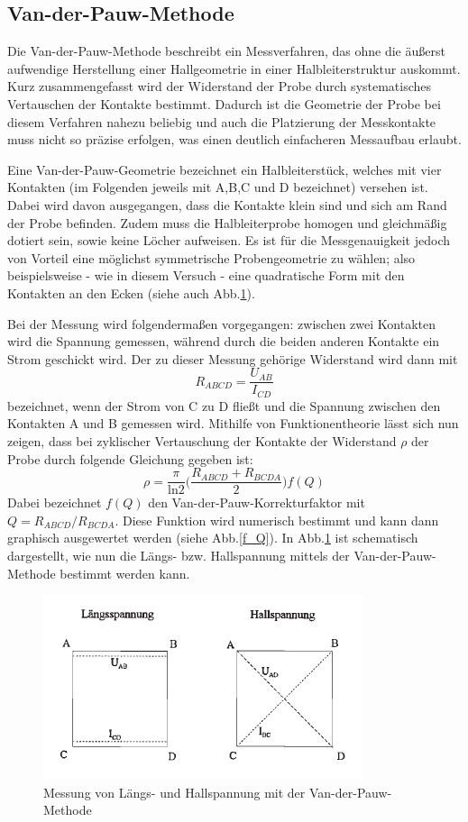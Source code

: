 	\subsection{Van-der-Pauw-Methode}
	Die Van-der-Pauw-Methode beschreibt ein Messverfahren, das ohne die äußerst aufwendige Herstellung einer Hallgeometrie in einer Halbleiterstruktur auskommt. Kurz zusammengefasst wird der Widerstand der Probe durch systematisches Vertauschen der Kontakte bestimmt. Dadurch ist die Geometrie der Probe bei diesem Verfahren nahezu beliebig und auch die Platzierung der Messkontakte muss nicht so präzise erfolgen, was einen deutlich einfacheren Messaufbau erlaubt.
	
	Eine Van-der-Pauw-Geometrie bezeichnet ein Halbleiterstück, welches mit vier Kontakten (im Folgenden jeweils mit A,B,C und D bezeichnet) versehen ist. Dabei wird davon ausgegangen, dass die Kontakte klein sind und sich am Rand der Probe befinden. Zudem muss die Halbleiterprobe homogen und gleichmäßig dotiert sein, sowie keine Löcher aufweisen. Es ist für die Messgenauigkeit jedoch von Vorteil eine möglichst symmetrische Probengeometrie zu wählen; also beispielsweise - wie in diesem Versuch - eine quadratische Form mit den Kontakten an den Ecken (siehe auch Abb.\ref{vdP}).
	
	Bei der Messung wird folgendermaßen vorgegangen: zwischen zwei Kontakten wird die Spannung gemessen, während durch die beiden anderen Kontakte ein Strom geschickt wird. Der zu dieser Messung gehörige Widerstand wird dann mit \[R_{ABCD}= \dfrac{U_{AB}}{I_{CD}}\] bezeichnet, wenn der Strom von C zu D fließt und die Spannung zwischen den Kontakten A und B gemessen wird.
	Mithilfe von Funktionentheorie lässt sich nun zeigen, dass bei zyklischer Vertauschung der Kontakte der Widerstand $\rho$ der Probe durch folgende Gleichung gegeben ist:
	\[\rho=\dfrac{\pi}{\text{ln}2}\bigg(\dfrac{R_{ABCD}+R_{BCDA}}{2}\bigg)f(Q)\]
	Dabei bezeichnet $f(Q)$ den Van-der-Pauw-Korrekturfaktor mit $Q=R_{ABCD}/R_{BCDA}$. Diese Funktion wird numerisch bestimmt und kann dann graphisch ausgewertet werden (siehe Abb.\ref{f_Q}).
	In Abb.\ref{vdP} ist schematisch dargestellt, wie nun die Längs- bzw. Hallspannung mittels der Van-der-Pauw-Methode bestimmt werden kann.
	
	\begin{figure}[H]
		\centering
		\includegraphics[width=0.5\linewidth]{Abb/vdp.PNG}
		\caption{Messung von Längs- und Hallspannung mit der Van-der-Pauw-Methode}
		\label{vdP}
	\end{figure}
	

